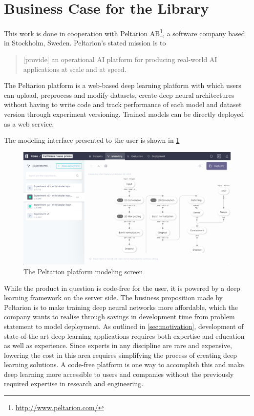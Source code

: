 \section{Business Case for the Library}\label{business-case}

This work is done in cooperation with Peltarion
AB\footnote{\url{http://www.peltarion.com/}}, a software company based in
Stockholm, Sweden. Peltarion's stated mission is to

\begin{quote}
    [provide] an
    operational AI platform for producing real-world AI applications at scale and at
    speed.
\end{quote}

The Peltarion platform is a web-based deep learning platform with which users
can upload, preprocess and modify datasets, create deep neural architectures
without having to write code and track performance of each model and dataset
version through experiment versioning. Trained models can be directly deployed
as a web service.

The modeling interface presented to the user is shown in \cref{fig:platform}

\begin{figure}
    \centering
    \includegraphics[width=\textwidth]{gfx/diagrams/software_screens/peltarion_platform.png}
    \caption{The Peltarion platform modeling screen}
    \label{fig:platform}
\end{figure}

While the product in question is code-free for the user, it is powered by a deep
learning framework on the server side. The business proposition made by
Peltarion is to make training deep neural networks more affordable, which the
company wants to realise through savings in development time from problem
statement to model deployment. As outlined in \cref{sec:motivation}, development
of state-of-the art deep learning applications requires both expertise and
education as well as experience. Since experts in any discipline are rare and
expensive, lowering the cost in this area requires simplifying the process of
creating deep learning solutions. A code-free platform is one way to accomplish
this and make deep learning more accessible to users and companies without the
previously required expertise in research and engineering.

